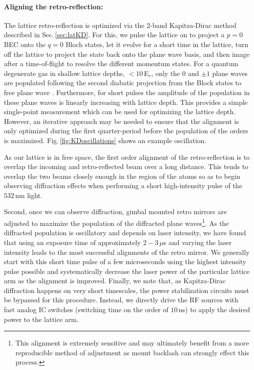 \paragraph{Aligning the retro-reflection:}
The lattice retro-reflection is optimized via the 2-band Kapitza-Dirac method described in Sec.\,\ref{sec:latKD}.
For this, we pulse the lattice on to project a $p=0$ BEC onto the $q=0$ Bloch states, let it evolve for a short time in the lattice, turn off the lattice to project the state back onto the plane wave basis, and then image after a time-of-flight to resolve the different momentum states.
For a quantum degenerate gas in shallow lattice depths, $<10$\,E$_r$, only the $0$ and $\pm1$ plane waves are populated following the second diabatic projection from the Block states to free plane wave \cite{Fallani2005,Denschlag2002}.
Furthermore, for short pulses the amplitude of the population in these plane waves is linearly increasing with lattice depth.
This provides a simple single-point measurement which can be used for optimizing the lattice depth.
However, an iterative approach may be needed to ensure that the alignment is only optimized during the first quarter-period before the population of the orders is maximized.
Fig.\,\ref{fig:KDoscillations} shows an example oscillation.

As our lattice is in free space, the first order alignment of the retro-reflection is to overlap the incoming and retro-reflected beam over a long distance.
This tends to overlap the two beams closely enough in the region of the atoms so as to begin observing diffraction effects when performing a short high-intensity pulse of the $532$\,nm light.

Second, once we can observe diffraction, gimbal mounted retro mirrors are adjusted to maximize the population of the diffracted plane waves\footnote{This alignment is extremely sensitive and may ultimately benefit from a more reproducible method of adjustment as mount backlash can strongly effect this process.}.
As the diffracted population is oscillatory and depends on laser intensity, we have found that using an exposure time of approximately $2 - 3$\,$\mu$s and varying the laser intensity leads to the most successful alignments of the retro mirror.
We generally start with this short time pulse of a few microseconds using the highest intensity pulse possible and systematically decrease the laser power of the particular lattice arm as the alignment is improved.
Finally, we note that, as Kapitza-Dirac diffraction happens on very short timescales, the power stabilization circuits must be bypassed for this procedure.
Instead, we directly drive the RF sources with fast analog IC switches (switching time on the order of $10$\,ns) to apply the desired power to the lattice arm.

